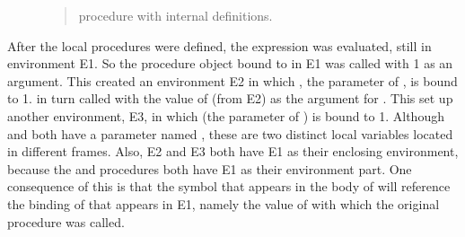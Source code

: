 \begin{figure}[tb]
\label{Figure 3.11}
\centering
\begin{comment}
\heading{Figure 3.11:} \code{sqrt} procedure with internal definitions.

\begin{example}
          +--------------------------------------------------+
global -->| sqrt: --+                                        |
env       |         |                                        |
          +---------|----------------------------------------+
                    V       ^                   ^
                .---.---.   |                   |
     +----------+-O | O-+---+        +----------+------------+
     |          `---^---'            | x: 2                  |
     V                         E1 -->| good-enough?: -+      |
parameters: x                        | improve: ...   |      |
body: (define good-enough? ...)      | sqrt-iter: ... |      |
      (define improve ...)           +----------------|------+
      (define sqrt-iter ...)          ^  ^            |     ^
      (sqrt-iter 1.0)                 |  |            V     |
                            +---------++ |        .---.---. |
                      E2 -->| guess: 1 | |        | O | O-+-+
                            +----------+ |        `-|-^---'
                      call to sqrt-iter  |          |
                                         |          V
                               +---------++    parameters: guess
                         E3 -->| guess: 1 |    body: (< (abs ...)
                               +----------+             ...)
                         call to good-enough?
\end{example}
\end{comment}

\begin{quote}
  procedure with internal definitions.
\end{quote}
\end{figure}

After the local procedures were defined, the expression 
was evaluated, still in environment E1.  So the procedure object bound to
 in E1 was called with 1 as an argument.  This created an
environment E2 in which , the parameter of , is
bound to 1.   in turn called  with the value
of  (from E2) as the argument for .  This set up
another environment, E3, in which  (the parameter of
) is bound to 1.  Although  and
 both have a parameter named , these are two
distinct local variables located in different frames.  Also, E2 and E3 both
have E1 as their enclosing environment, because the  and
 procedures both have E1 as their environment part.  One
consequence of this is that the symbol  that appears in the body of
 will reference the binding of  that appears in E1,
namely the value of  with which the original  procedure was
called.

